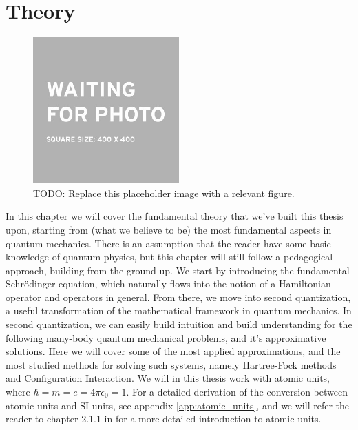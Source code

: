 \documentclass{subfiles}
\begin{document}
\chapter{Theory}
\begin{figure}
\centering
\includegraphics[width=0.5\textwidth]{figs/placeholder_image.jpeg}
\caption{TODO: Replace this placeholder image with a relevant figure. }
\label{fig:theory_intro}
\end{figure}
In this chapter we will cover the fundamental theory that we've built this thesis upon, starting from (what we believe to be) the most fundamental aspects in quantum mechanics.
There is an assumption that the reader have some basic knowledge of quantum physics, but this chapter will still follow a pedagogical approach, building from the ground up.
We start by introducing the fundamental Schrödinger equation, which naturally flows into the notion of a Hamiltonian operator and operators in general. From there, we move into 
second quantization, a useful transformation of the mathematical framework in quantum mechanics. In second quantization, we can easily build intuition and build understanding for
the following many-body quantum mechanical problems, and it's approximative solutions. Here we will cover some of the most applied approximations, and the most studied methods for solving
such systems, namely Hartree-Fock methods and Configuration Interaction. We will in this thesis work with atomic units, where $\hbar = m = e = 4\pi\epsilon_0 = 1$. For a detailed derivation of the conversion between atomic units and SI units, see appendix \ref{app:atomic_units}, and we will refer the reader to chapter 2.1.1 in \cite{szabo1996modern} for a more detailed introduction to atomic units.
\newpage





\end{document}
